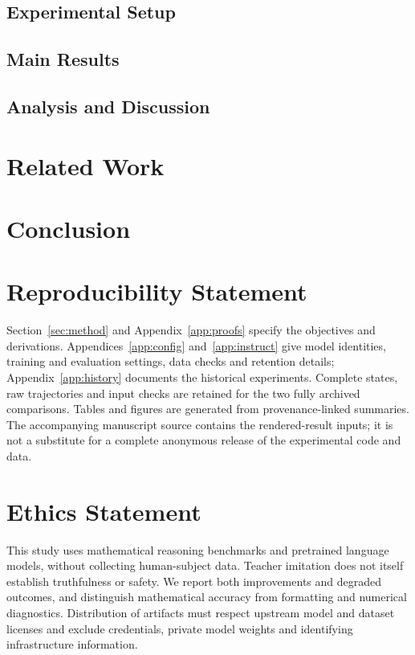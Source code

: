 \subsection{Experimental Setup}
\label{sec:protocol}


\subsection{Main Results}
\label{sec:results}


\subsection{Analysis and Discussion}
\label{sec:analysis}


\section{Related Work}
\label{sec:related}


\section{Conclusion}

\FloatBarrier
\label{mainend}

\section*{Reproducibility Statement}
Section~\ref{sec:method} and Appendix~\ref{app:proofs} specify the objectives and derivations. Appendices~\ref{app:config} and~\ref{app:instruct} give model identities, training and evaluation settings, data checks and retention details; Appendix~\ref{app:history} documents the historical experiments. Complete states, raw trajectories and input checks are retained for the two fully archived comparisons. Tables and figures are generated from provenance-linked summaries. The accompanying manuscript source contains the rendered-result inputs; it is not a substitute for a complete anonymous release of the experimental code and data.

\section*{Ethics Statement}
This study uses mathematical reasoning benchmarks and pretrained language models, without collecting human-subject data. Teacher imitation does not itself establish truthfulness or safety. We report both improvements and degraded outcomes, and distinguish mathematical accuracy from formatting and numerical diagnostics. Distribution of artifacts must respect upstream model and dataset licenses and exclude credentials, private model weights and identifying infrastructure information.

